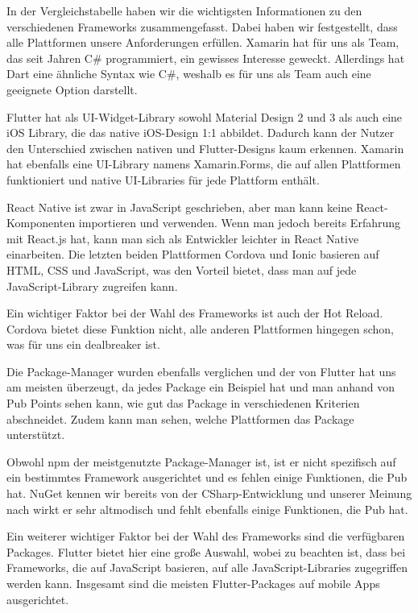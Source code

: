 In der Vergleichstabelle haben wir die wichtigsten Informationen zu den verschiedenen Frameworks zusammengefasst. Dabei haben wir festgestellt, dass alle Plattformen unsere Anforderungen erfüllen. Xamarin hat für uns als Team, das seit Jahren C\# programmiert, ein gewisses Interesse geweckt. Allerdings hat Dart eine ähnliche Syntax wie C\#, weshalb es für uns als Team auch eine geeignete Option darstellt.

Flutter hat als UI-Widget-Library sowohl Material Design 2 und 3 als auch eine iOS Library, die das native iOS-Design 1:1 abbildet. Dadurch kann der Nutzer den Unterschied zwischen nativen und Flutter-Designs kaum erkennen. Xamarin hat ebenfalls eine UI-Library namens Xamarin.Forms, die auf allen Plattformen funktioniert und native UI-Libraries für jede Plattform enthält.

React Native ist zwar in JavaScript geschrieben, aber man kann keine React-Komponenten importieren und verwenden. Wenn man jedoch bereits Erfahrung mit React.js hat, kann man sich als Entwickler leichter in React Native einarbeiten. Die letzten beiden Plattformen Cordova und Ionic basieren auf HTML, CSS und JavaScript, was den Vorteil bietet, dass man auf jede JavaScript-Library zugreifen kann.

Ein wichtiger Faktor bei der Wahl des Frameworks ist auch der Hot Reload. Cordova bietet diese Funktion nicht, alle anderen Plattformen hingegen schon, was für uns ein dealbreaker ist.

Die Package-Manager wurden ebenfalls verglichen und der von Flutter hat uns am meisten überzeugt, da jedes Package ein Beispiel hat und man anhand von Pub Points sehen kann, wie gut das Package in verschiedenen Kriterien abschneidet. Zudem kann man sehen, welche Plattformen das Package unterstützt.

Obwohl npm der meistgenutzte Package-Manager ist, ist er nicht spezifisch auf ein bestimmtes Framework ausgerichtet und es fehlen einige Funktionen, die Pub hat. NuGet kennen wir bereits von der CSharp-Entwicklung und unserer Meinung nach wirkt er sehr altmodisch und fehlt ebenfalls einige Funktionen, die Pub hat.

Ein weiterer wichtiger Faktor bei der Wahl des Frameworks sind die verfügbaren Packages. Flutter bietet hier eine große Auswahl, wobei zu beachten ist, dass bei Frameworks, die auf JavaScript basieren, auf alle JavaScript-Libraries zugegriffen werden kann. Insgesamt sind die meisten Flutter-Packages auf mobile Apps ausgerichtet.

